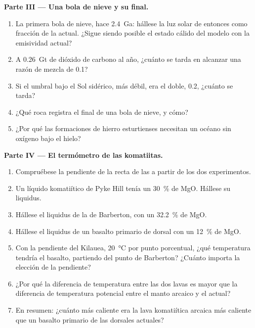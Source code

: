 \begin{problem}
\noindent\textbf{Parte III --- Una bola de nieve y su final.}
\begin{enumerate}[resume]
  \item La primera bola de nieve, hace \qty{2.4}{Ga}: hállese la luz solar de entonces como fracción de la actual.
        ¿Sigue siendo posible el estado cálido del modelo con la emisividad actual?
  \item A \qty{0.26}{Gt} de dióxido de carbono al año, ¿cuánto se tarda en alcanzar una razón de
        mezcla de 0.1?
  \item Si el umbral bajo el Sol sidérico, más débil, era el doble, 0.2, ¿cuánto se tarda?
  \item ¿Qué roca registra el final de una bola de nieve, y cómo?
  \item ¿Por qué las formaciones de hierro esturtienses necesitan un océano sin oxígeno bajo el hielo?
\end{enumerate}

\noindent\textbf{Parte IV --- El termómetro de las komatiitas.}
\begin{enumerate}[resume]
  \item Compruébese la pendiente de la recta de las  a partir de los dos experimentos.
  \item Un líquido komatiítico de Pyke Hill tenía un \qty{30}{\percent} de MgO. Hállese su liquidus.
  \item Hállese el liquidus de la  de Barberton, con un \qty{32.2}{\percent} de MgO.
  \item Hállese el liquidus de un basalto primario de dorsal con un \qty{12}{\percent} de MgO.
  \item Con la pendiente del Kilauea, \qty{20}{\celsius} por punto porcentual, ¿qué temperatura tendría el
        basalto, partiendo del punto de Barberton? ¿Cuánto importa la elección de la pendiente?
  \item ¿Por qué la diferencia de temperatura entre las dos lavas es mayor que la diferencia de
        temperatura potencial entre el manto arcaico y el actual?
  \item En resumen: ¿cuánto más caliente era la lava komatiítica arcaica más caliente que un basalto primario
        de las dorsales actuales?
\end{enumerate}
\end{problem}
